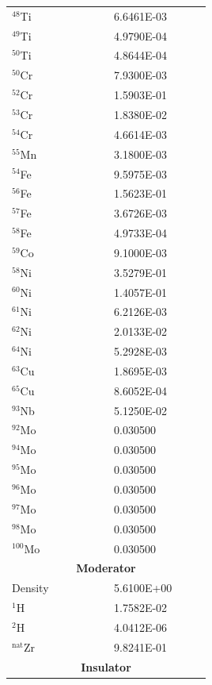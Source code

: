 \documentclass[8pt,a4paper]{article}
\begin{document}
\begin{longtable}{|m{0.3\linewidth}|m{0.2\linewidth}|}
    $^{48}$Ti & \SI{6.6461E-03}{} \\
    $^{49}$Ti & \SI{4.9790E-04}{} \\
    $^{50}$Ti & \SI{4.8644E-04}{} \\
    $^{50}$Cr & \SI{7.9300E-03}{} \\
    $^{52}$Cr & \SI{1.5903E-01}{} \\
    $^{53}$Cr & \SI{1.8380E-02}{} \\
    $^{54}$Cr & \SI{4.6614E-03}{} \\
    $^{55}$Mn & \SI{3.1800E-03}{} \\
    $^{54}$Fe & \SI{9.5975E-03}{} \\
    $^{56}$Fe & \SI{1.5623E-01}{} \\
    $^{57}$Fe & \SI{3.6726E-03}{} \\
    $^{58}$Fe & \SI{4.9733E-04}{} \\
    $^{59}$Co & \SI{9.1000E-03}{} \\
    $^{58}$Ni & \SI{3.5279E-01}{} \\
    $^{60}$Ni & \SI{1.4057E-01}{} \\
    $^{61}$Ni & \SI{6.2126E-03}{} \\
    $^{62}$Ni & \SI{2.0133E-02}{} \\
    $^{64}$Ni & \SI{5.2928E-03}{} \\
    $^{63}$Cu & \SI{1.8695E-03}{} \\
    $^{65}$Cu & \SI{8.6052E-04}{} \\
    $^{93}$Nb & \SI{5.1250E-02}{} \\
    $^{92}$Mo & \SI{0.030500}{} \\
    $^{94}$Mo & \SI{0.030500}{} \\
    $^{95}$Mo & \SI{0.030500}{} \\
    $^{96}$Mo & \SI{0.030500}{} \\
    $^{97}$Mo & \SI{0.030500}{} \\
    $^{98}$Mo & \SI{0.030500}{} \\
    $^{100}$Mo & \SI{0.030500}{} \\\hline
    \multicolumn{2}{|c|}{\textbf{Moderator}}\\\hline
    Density & \SI{5.6100E+00}{} \\
    $^{1}$H & \SI{1.7582E-02}{} \\
    $^{2}$H & \SI{4.0412E-06}{} \\
    $^{\text{nat}}$Zr & \SI{9.8241E-01}{} \\\hline
    \multicolumn{2}{|c|}{\textbf{Insulator}}\\\hline

\end{longtable}
\end{document}
